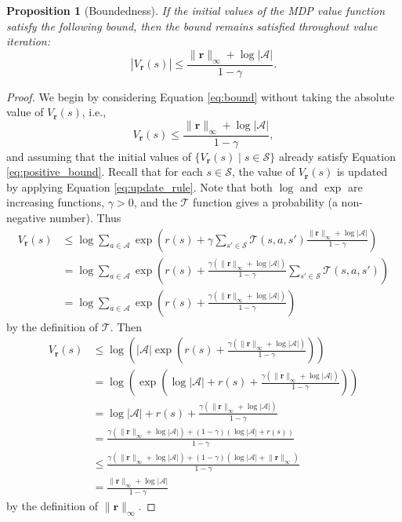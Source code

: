 \documentclass{mpaper}
\newtheorem{proposition}[theorem]{Proposition}
\newcommand{\V}{V_{\mathbf{r}}}
\newcommand{\vbound}{\frac{\rinf + \log|\mathcal{A}|}{1 - \gamma}}
\newcommand{\rinf}{\lVert \mathbf{r} \rVert_\infty}
\begin{document}
\begin{proposition}[Boundedness] \label{thm:bound}
  If the initial values of the MDP value function satisfy the following
  bound, then the bound remains satisfied throughout value iteration:
  \begin{equation} \label{eq:bound}
    |\V(s)| \le \vbound.
  \end{equation}
\end{proposition}
\begin{proof}
  We begin by considering Equation \ref{eq:bound} without taking the absolute value of
  $\V(s)$, i.e.,
  \begin{equation} \label{eq:positive_bound}
    \V(s) \le \vbound,
  \end{equation}
  and assuming that the initial values of $\{ \V(s) \mid s \in
  \mathcal{S} \}$ already satisfy Equation \ref{eq:positive_bound}. Recall that for
  each $s \in \mathcal{S}$, the value of $\V(s)$ is updated by applying Equation
  \ref{eq:update_rule}. Note that both $\log$ and $\exp$ are increasing
  functions, $\gamma > 0$, and the $\mathcal{T}$ function gives a probability (a
  non-negative number). Thus
  \begin{align*}
    \V(s) &\le \log \sum_{a \in \mathcal{A}} \exp\left( r(s) + \gamma\sum_{s' \in \mathcal{S}} \mathcal{T}(s, a, s')\frac{\rinf + \log|\mathcal{A}|}{1 - \gamma} \right) \\
          &= \log \sum_{a \in \mathcal{A}} \exp\left( r(s) + \frac{\gamma (\rinf + \log|\mathcal{A}|)}{1 - \gamma}\sum_{s' \in \mathcal{S}} \mathcal{T}(s, a, s') \right) \\
          &= \log \sum_{a \in \mathcal{A}} \exp\left( r(s) + \frac{\gamma (\rinf + \log|\mathcal{A}|)}{1 - \gamma} \right)
  \end{align*}
  by the definition of $\mathcal{T}$. Then
  \begin{align*}
    \V(s) &\le \log \left( |\mathcal{A}| \exp\left( r(s) + \frac{\gamma (\rinf + \log|\mathcal{A}|)}{1 - \gamma} \right) \right) \\
          &= \log \left( \exp\left( \log|\mathcal{A}| + r(s) + \frac{\gamma (\rinf + \log|\mathcal{A}|)}{1 - \gamma} \right) \right) \\
          &= \log|\mathcal{A}| + r(s) + \frac{\gamma (\rinf + \log|\mathcal{A}|)}{1 - \gamma} \\
          &= \frac{\gamma (\rinf + \log|\mathcal{A}|) + (1 - \gamma)(\log|\mathcal{A}| + r(s))}{1 - \gamma} \\
          &\le \frac{\gamma (\rinf + \log|\mathcal{A}|) + (1 - \gamma)(\log|\mathcal{A}| + \rinf)}{1 - \gamma} \\
          &= \vbound
  \end{align*}
  by the definition of $\rinf$.


\end{proof}
\end{document}

